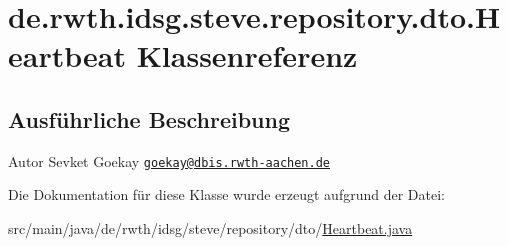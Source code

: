 \hypertarget{classde_1_1rwth_1_1idsg_1_1steve_1_1repository_1_1dto_1_1_heartbeat}{\section{de.\-rwth.\-idsg.\-steve.\-repository.\-dto.\-Heartbeat Klassenreferenz}
\label{classde_1_1rwth_1_1idsg_1_1steve_1_1repository_1_1dto_1_1_heartbeat}
}


\subsection{Ausführliche Beschreibung}
\begin{DoxyAuthor}{Autor}
Sevket Goekay \href{mailto:goekay@dbis.rwth-aachen.de}{\tt goekay@dbis.\-rwth-\/aachen.\-de} 
\end{DoxyAuthor}


Die Dokumentation für diese Klasse wurde erzeugt aufgrund der Datei\-:\begin{DoxyCompactItemize}
\item 
src/main/java/de/rwth/idsg/steve/repository/dto/\hyperlink{_heartbeat_8java}{Heartbeat.\-java}\end{DoxyCompactItemize}
